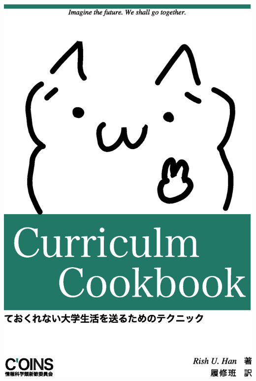 \documentclass[a4j]{jsarticle}
\begin{document}
\thispagestyle{empty}
\vspace*{-1truein}%
\vspace*{-\topmargin}
\vspace*{-\headheight}
\vspace*{-\headsep}
\vspace*{-\topskip}
\vspace{7mm}
\begin{center}%
\noindent
\hspace*{-1in}
\includegraphics[width=1.1\fullwidth]{pic/hyousi/oreilly.eps}%
\hspace*{-1in}
\vspace*{-10cm}
\end{center}%
\newpage

\tableofcontents
\end{document}
